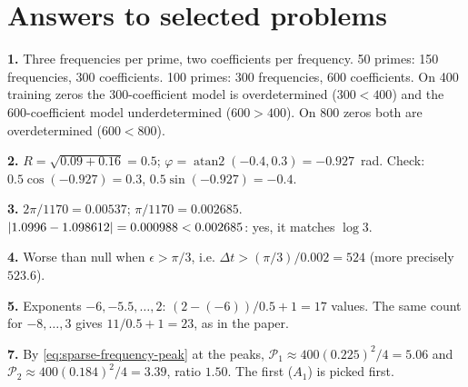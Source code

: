 \begin{problemlist}


\end{problemlist}

\section{Answers to selected problems}

\textbf{1.} Three frequencies per prime, two coefficients per frequency. 50 primes: 150 frequencies, 300 coefficients. 100 primes: 300 frequencies, 600 coefficients. On 400 training zeros the 300-coefficient model is overdetermined ($300<400$) and the 600-coefficient model underdetermined ($600>400$). On 800 zeros both are overdetermined ($600<800$).

\textbf{2.} $R=\sqrt{0.09+0.16}=0.5$; $\varphi=\operatorname{atan2}(-0.4,0.3)=-0.927$~rad. Check: $0.5\cos(-0.927)=0.3$, $0.5\sin(-0.927)=-0.4$.

\textbf{3.} $2\pi/1170=0.00537$; $\pi/1170=0.002685$. $\left\lvert 1.0996-1.098612\right\rvert=0.000988<0.002685$: yes, it matches $\log3$.

\textbf{4.} Worse than null when $\epsilon>\pi/3$, i.e. $\Delta t>(\pi/3)/0.002=524$ (more precisely $523.6$).

\textbf{5.} Exponents $-6,-5.5,\dots,2$: $(2-(-6))/0.5+1=17$ values. The same count for $-8,\dots,3$ gives $11/0.5+1=23$, as in the paper.

\textbf{7.} By \eqref{eq:sparse-frequency-peak} at the peaks, $\mathcal P_1\approx400(0.225)^2/4=5.06$ and $\mathcal P_2\approx400(0.184)^2/4=3.39$, ratio $1.50$. The first ($A_1$) is picked first.

